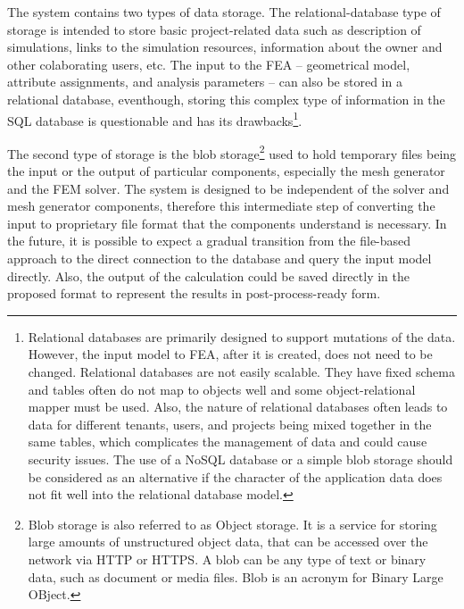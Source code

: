 The system contains two types of data storage. The relational-database type of storage is intended to store basic project-related data such as description of simulations, links to the simulation resources, information about the owner and other colaborating users, etc. The input to the FEA -- geometrical model, attribute assignments, and analysis parameters -- can also be stored in a relational database, eventhough, storing this complex type of information in the SQL database is questionable and has its drawbacks\footnote{Relational databases are primarily designed to support mutations of the data. However, the input model to FEA, after it is created, does not need to be changed. Relational databases are not easily scalable. They have fixed schema and tables often do not map to objects well and some object-relational mapper must be used. Also, the nature of relational databases often leads to data for different tenants, users, and projects being mixed together in the same tables, which complicates the management of data and could cause security issues. The use of a NoSQL database or a simple blob storage should be considered as an alternative if the character of the application data does not fit well into the relational database model.}.

The second type of storage is the blob storage\footnote{Blob storage is also referred to as Object storage. It is a service for storing large amounts of unstructured object data, that can be accessed over the network via HTTP or HTTPS. A blob can be any type of text or binary data, such as document or media files. Blob is an acronym for Binary Large OBject.} used to hold temporary files being the input or the output of particular components, especially the mesh generator and the FEM solver. The system is designed to be independent of the solver and mesh generator components, therefore this intermediate step of converting the input to proprietary file format that the components understand is necessary. In the future, it is possible to expect a gradual transition from the file-based approach to the direct connection to the database and query the input model directly. Also, the output of the calculation could be saved directly in the proposed format to represent the results in post-process-ready form.

